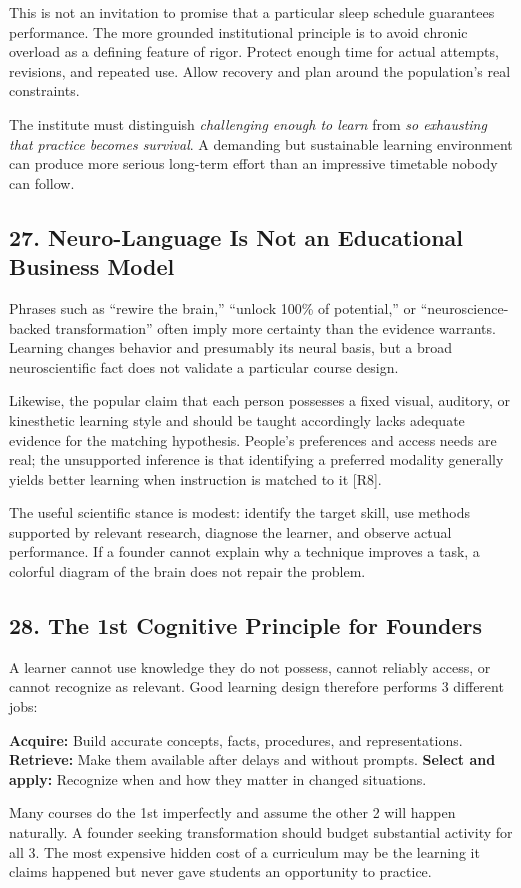 This is not an invitation to promise that a particular sleep schedule guarantees performance. The more grounded institutional principle is to avoid chronic overload as a defining feature of rigor. Protect enough time for actual attempts, revisions, and repeated use. Allow recovery and plan around the population's real constraints.

The institute must distinguish \emph{challenging enough to learn} from \emph{so exhausting that practice becomes survival}. A demanding but sustainable learning environment can produce more serious long-term effort than an impressive timetable nobody can follow.

\subsection*{27. Neuro-Language Is Not an Educational Business Model}

Phrases such as ``rewire the brain,'' ``unlock 100\% of potential,'' or ``neuroscience-backed transformation'' often imply more certainty than the evidence warrants. Learning changes behavior and presumably its neural basis, but a broad neuroscientific fact does not validate a particular course design.

Likewise, the popular claim that each person possesses a fixed visual, auditory, or kinesthetic learning style and should be taught accordingly lacks adequate evidence for the matching hypothesis. People's preferences and access needs are real; the unsupported inference is that identifying a preferred modality generally yields better learning when instruction is matched to it [R8].

The useful scientific stance is modest: identify the target skill, use methods supported by relevant research, diagnose the learner, and observe actual performance. If a founder cannot explain why a technique improves a task, a colorful diagram of the brain does not repair the problem.

\subsection*{28. The 1st Cognitive Principle for Founders}

A learner cannot use knowledge they do not possess, cannot reliably access, or cannot recognize as relevant. Good learning design therefore performs 3 different jobs:

\textbf{Acquire:} Build accurate concepts, facts, procedures, and representations. \textbf{Retrieve:} Make them available after delays and without prompts. \textbf{Select and apply:} Recognize when and how they matter in changed situations.

Many courses do the 1st imperfectly and assume the other 2 will happen naturally. A founder seeking transformation should budget substantial activity for all 3. The most expensive hidden cost of a curriculum may be the learning it claims happened but never gave students an opportunity to practice.
